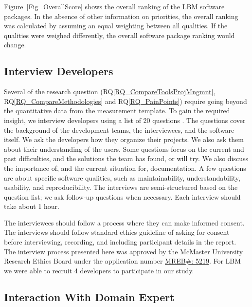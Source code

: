 \documentclass[runningheads]{llncs}
\newcommand{\rqref}[1]{RQ\ref{#1}}
\begin{document}
Figure~\ref{Fig_OverallScore} shows the overall ranking of the LBM software
packages. In the absence of other information on priorities, the overall ranking
was calculated by assuming an equal weighting between all qualities. If the
qualities were weighed differently, the overall software package ranking would
change.

\subsection{Interview Developers} \label{SecSurvey}

Several of the research question (\rqref{RQ_CompareToolsProjMngmnt},
\rqref{RQ_CompareMethodologies} and \rqref{RQ_PainPoints}) require going beyond
the quantitative data from the measurement template. To gain the required
insight, we interview developers using a list of 20 questions
\cite{SmithEtAl2021}. The questions cover the background of the development
teams, the interviewees, and the software itself. We ask the developers how they
organize their projects. We also ask them about their understanding of the
users. Some questions focus on the current and past difficulties, and the
solutions the team has found, or will try. We also discuss the importance of,
and the current situation for, documentation. A few questions are about specific
software qualities, such as maintainability, understandability, usability, and
reproducibility. The interviews are semi-structured based on the question list;
we ask follow-up questions when necessary.  Each interview should take about 1
hour.

The interviewees should follow a process where they can make informed consent.
The interviews should follow standard ethics guideline of asking for consent
before interviewing, recording, and including participant details in the report.
The interview process presented here was approved by the McMaster University
Research Ethics Board under the application number 
\href{https://github.com/smiths/AIMSS/blob/master/StateOfPractice/MACREM/Application.pdf}
{MREB\#: 5219}.  For LBM we were able to recruit 4 developers to participate in
our study.

\subsection{Interaction With Domain Expert} \label{sec_vet_software_list}
\end{document}
